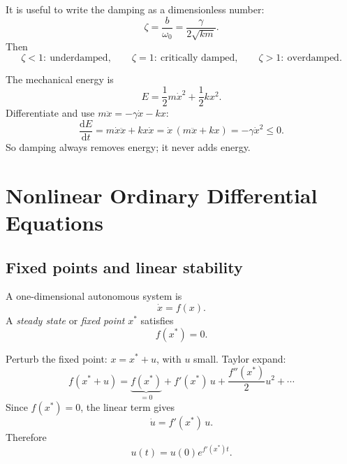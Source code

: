 \documentclass[10.5pt,a4paper]{article}
\newcommand{\dd}{\mathrm{d}}
\newcommand{\x}{\mathbf{x}}
\begin{document}
It is useful to write the damping as a dimensionless number:
\[
\zeta=\frac{b}{\omega_0}
=\frac{\gamma}{2\sqrt{km}}.
\]
Then
\[
\zeta<1:\ \text{underdamped},\qquad
\zeta=1:\ \text{critically damped},\qquad
\zeta>1:\ \text{overdamped}.
\]

\begin{derivbox}
The mechanical energy is
\[
E=\frac12m\dot x^2+\frac12kx^2.
\]
Differentiate and use \(m\ddot x=-\gamma\dot x-kx\):
\[
\frac{\dd E}{\dd t}
=m\dot x\ddot x+kx\dot x
=\dot x\,(m\ddot x+kx)
=-\gamma\dot x^2\le0.
\]
So damping always removes energy; it never adds energy.
\end{derivbox}

\begin{center}
\end{center}

\clearpage
{}
\section{Nonlinear Ordinary Differential Equations}

\subsection{Fixed points and linear stability}

A one-dimensional autonomous system is
\[
\dot x=f(x).
\]
A \emph{steady state} or \emph{fixed point} \(x^*\) satisfies
\[
f(x^*)=0.
\]

\begin{derivbox}
Perturb the fixed point: \(x=x^*+u\), with \(u\) small. Taylor expand:
\[
f(x^*+u)=\underbrace{f(x^*)}_{=0}+f'(x^*)\,u
+\frac{f''(x^*)}{2}u^2+\cdots
\]
Since \(f(x^*)=0\), the linear term gives
\[
\dot u=f'(x^*)\,u.
\]
Therefore
\[
u(t)=u(0)e^{f'(x^*)t}.
\]
\end{derivbox}
\end{document}
